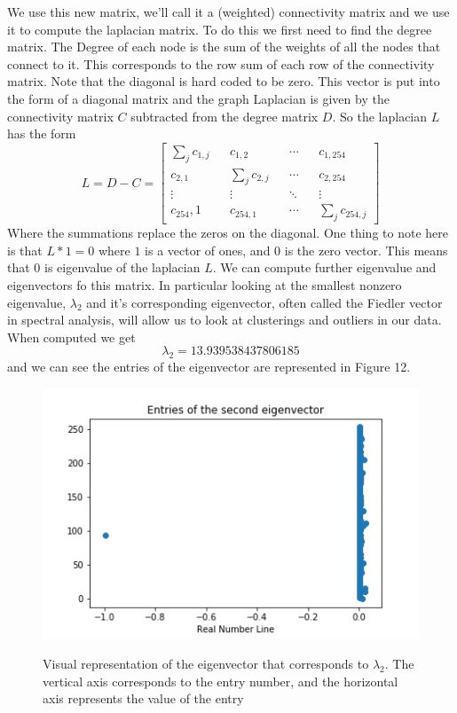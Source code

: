 \documentclass{article}
\theoremstyle{definition} \newtheorem*{lte}{Definition}
\theoremstyle{plain} \newtheorem*{csbt}{Theorem}
\begin{document}
We use this new matrix, we'll call it a (weighted) connectivity matrix and we use it to compute the laplacian matrix. To do this we first need to find the degree matrix. The Degree of each node is the sum of the weights of all the nodes that connect to it. This corresponds to the row sum of each row of the connectivity matrix. Note that the diagonal is hard coded to be zero. This vector is put into the form of a diagonal matrix and the graph Laplacian is given by the connectivity matrix $C$ subtracted from the degree matrix $D$. So the laplacian $L$ has the form 
$$L = D - C = \begin{bmatrix} 
\sum_j c_{1, j} && c_{1, 2} && \cdots && c_{1, 254} \\
c_{2,1} && \sum_j c_{2, j} && \cdots && c_{2, 254} \\
\vdots && \vdots && \ddots && \vdots \\
c{_254, 1} && c_{254, 1} && \cdots && \sum_j c_{254, j} 
\end{bmatrix}$$
Where the summations replace the zeros on the diagonal. One thing to note here is that $L*1 = 0$ where $1$ is a vector of ones, and $0$ is the zero vector. This means that $0$ is eigenvalue of the laplacian $L$. We can compute further eigenvalue and eigenvectors fo this matrix. In particular looking at the smallest nonzero eigenvalue, $\lambda_2$ and it's corresponding eigenvector, often called the Fiedler vector in spectral analysis, will allow us to look at clusterings and outliers in our data. When computed we get 
$$\lambda_2 = 13.939538437806185$$ 
and we can see the entries of the eigenvector are represented in Figure 12. 

\begin{figure}[H]
\begin{center}
\begin{subfloat}{
\includegraphics[width = .4\linewidth]{Eigvector.jpg}
}\end{subfloat}
\caption{ Visual representation of the eigenvector that corresponds to $\lambda_2$. The vertical axis corresponds to the entry number, and the horizontal axis represents the value of the entry}
\end{center}
\end{figure}
\end{document}
